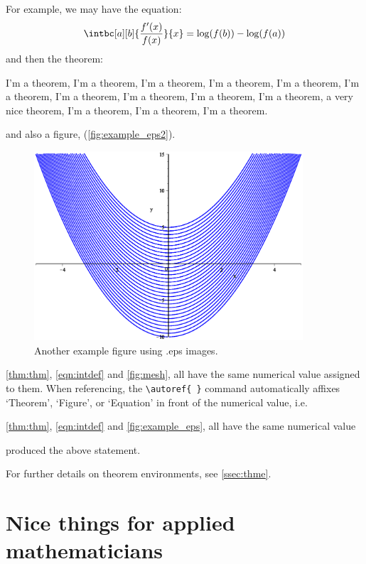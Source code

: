 For example, we may have the equation:
\begin{equation}\label{eqn:intdef}
\intbc[a][b]{\frac{f'(x)}{f(x)}}{x} = \log(f(b)) - \log(f(a))
\end{equation}
%
%
and then the theorem:
\begin{theorem}\label{thm:thm}
I'm a theorem, I'm a theorem, I'm a theorem, I'm a theorem, I'm a theorem, I'm a theorem, I'm a theorem, I'm a theorem, I'm a theorem, I'm a theorem, a very nice theorem, I'm a theorem, I'm a theorem, I'm a theorem.
\end{theorem}
and also a figure, (\autoref{fig:example_eps2}).
\begin{figure}[ht!]
\centering
\includegraphics[width=100mm]{Figures/example_figure2.eps}
\caption{Another example figure using .eps images.}
\label{fig:example_eps2}
\end{figure}

\autoref{thm:thm}, \autoref{eqn:intdef} and \autoref{fig:mesh}, all have the same numerical value assigned to them.
When referencing, the \verb|\autoref{ }| command automatically affixes `Theorem', `Figure', or `Equation' in front of the numerical value, i.e.
\begin{spverbatim}
\autoref{thm:thm}, \autoref{eqn:intdef} and \autoref{fig:example_eps}, all have the same numerical value
\end{spverbatim}
produced the above statement.

For further details on theorem environments, see \autoref{ssec:thme}.

\section{Nice things for applied mathematicians}
